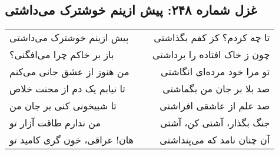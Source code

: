 \begin{center}
\section*{غزل شماره ۲۴۸: پیش ازینم خوشترک می‌داشتی}
\label{sec:248}
\begin{longtable}{l p{0.5cm} r}
پیش ازینم خوشترک می‌داشتی
&&
تا چه کردم؟ کز کفم بگذاشتی
\\
باز بر خاکم چرا می‌افگنی؟
&&
چون ز خاک افتاده را برداشتی
\\
من هنوز از عشق جانی می‌کنم
&&
تو مرا خود مرده‌ای انگاشتی
\\
تا نیابم یک دم از محنت خلاص
&&
صد بلا بر جان من بگماشتی
\\
تا شبیخونی کنی بر جان من
&&
صد علم از عاشقی افراشتی
\\
من ندارم طاقت آزار تو
&&
جنگ بگذار، آشتی کن، آشتی
\\
هان! عراقی، خون گری کامید تو
&&
آن چنان نامد که می‌پنداشتی
\\
\end{longtable}
\end{center}
